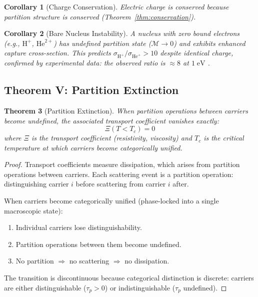 \documentclass[twocolumn,10pt,a4paper]{article}
\theoremstyle{plain}
\newtheorem{theorem}{Theorem}[section]
\newtheorem{corollary}[theorem]{Corollary}
\theoremstyle{definition}
\theoremstyle{remark}
\newcommand{\Depth}{\mathcal{M}}
\newcommand{\taup}{\tau_p}
\begin{document}
\begin{corollary}[Charge Conservation]
\label{cor:charge_conservation}
Electric charge is conserved because partition structure is conserved (Theorem~\ref{thm:conservation}).
\end{corollary}

\begin{corollary}[Bare Nucleus Instability]
\label{cor:bare_nucleus}
A nucleus with zero bound electrons (e.g., $\mathrm{H}^+$, $\mathrm{He}^{2+}$) has undefined partition state ($\Depth \to 0$) and exhibits enhanced capture cross-section. This predicts $\sigma_{\mathrm{H}^+}/\sigma_{\mathrm{He}^+} > 10$ despite identical charge, confirmed by experimental data: the observed ratio is $\approx 8$ at $1\;\mathrm{eV}$ \cite{janev1987}.
\end{corollary}

\subsection{Theorem V: Partition Extinction}

\begin{theorem}[Partition Extinction]
\label{thm:extinction}
When partition operations between carriers become undefined, the associated transport coefficient vanishes exactly:
\begin{equation}
    \Xi(T < T_c) = 0
\end{equation}
where $\Xi$ is the transport coefficient (resistivity, viscosity) and $T_c$ is the critical temperature at which carriers become categorically unified.
\end{theorem}

\begin{proof}
Transport coefficients measure dissipation, which arises from partition operations between carriers. Each scattering event is a partition operation: distinguishing carrier $i$ before scattering from carrier $i$ after.

When carriers become categorically unified (phase-locked into a single macroscopic state):
\begin{enumerate}
    \item Individual carriers lose distinguishability.
    \item Partition operations between them become undefined.
    \item No partition $\Rightarrow$ no scattering $\Rightarrow$ no dissipation.
\end{enumerate}
The transition is discontinuous because categorical distinction is discrete: carriers are either distinguishable ($\taup > 0$) or indistinguishable ($\taup$ undefined).
\end{proof}
\end{document}

